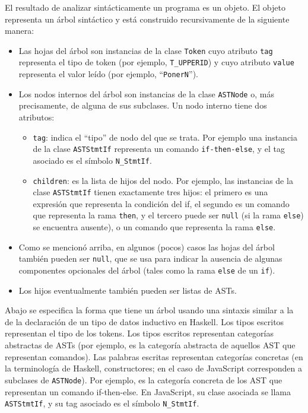 \documentclass{article}
\begin{document}
El resultado de analizar sint\'acticamente un programa es un objeto.
El objeto representa un \'arbol sint\'actico y est\'a construido
recursivamente de la siguiente manera:
\begin{itemize}
\item Las hojas del \'arbol son instancias de la clase \texttt{Token}
      cuyo atributo 
      \texttt{tag} representa el tipo de token (por ejemplo,
      \texttt{T\_UPPERID})
      y cuyo atributo \texttt{value} representa el valor le\'ido
      (por ejemplo, ``\texttt{PonerN}'').
\item Los nodos internos del \'arbol son instancias de la clase
      \texttt{ASTNode} o, m\'as precisamente, de alguna de sus subclases.
      Un nodo interno tiene dos atributos:
      \begin{itemize}
      \item \texttt{tag}: indica el ``tipo'' de nodo del que se trata.
            Por ejemplo
            una instancia de la clase \texttt{ASTStmtIf}
            representa un comando \texttt{if-then-else},
            y el tag asociado es el s\'imbolo \texttt{N\_StmtIf}.
      \item \texttt{children}: es la lista de hijos del nodo.
            Por ejemplo,
            las instancias de la clase \texttt{ASTStmtIf}
            tienen exactamente tres hijos:
            el primero es una expresi\'on que representa la condici\'on
            del if,
            el segundo es un comando que representa la rama \texttt{then},
            y el tercero puede ser \texttt{null} (si la rama \texttt{else})
            se encuentra ausente), o un comando que representa la rama \texttt{else}.
      \end{itemize}
\item Como se mencion\'o arriba, en algunos (pocos) casos
      las hojas del \'arbol tambi\'en pueden ser \texttt{null},
      que se usa para indicar la ausencia de algunas
      componentes opcionales del \'arbol (tales como la rama \texttt{else}
      de un \texttt{if}).
\item Los hijos eventualmente tambi\'en pueden ser listas de ASTs.
\end{itemize}

Abajo se especifica la forma que tiene un \'arbol usando una sintaxis
similar a la de la declaraci\'on de un tipo de datos inductivo en
Haskell.
Los tipos escritos  representan el tipo de los tokens.
Los tipos escritos  representan categor\'ias
abstractas de ASTs
(por ejemplo,  es la categor\'ia abstracta de aquellos
AST que representan comandos).
Las palabras escritas  representan categor\'ias concretas
(en la terminolog\'ia de Haskell, constructores; en el caso de JavaScript
corresponden a subclases de \texttt{ASTNode}).
Por ejemplo,  es la categor\'ia concreta de los AST que
representan un comando if-then-else.
En JavaScript, su clase asociada se llama \texttt{ASTStmtIf},
y su tag asociado es el s\'imbolo \texttt{N\_StmtIf}.
\end{document}
